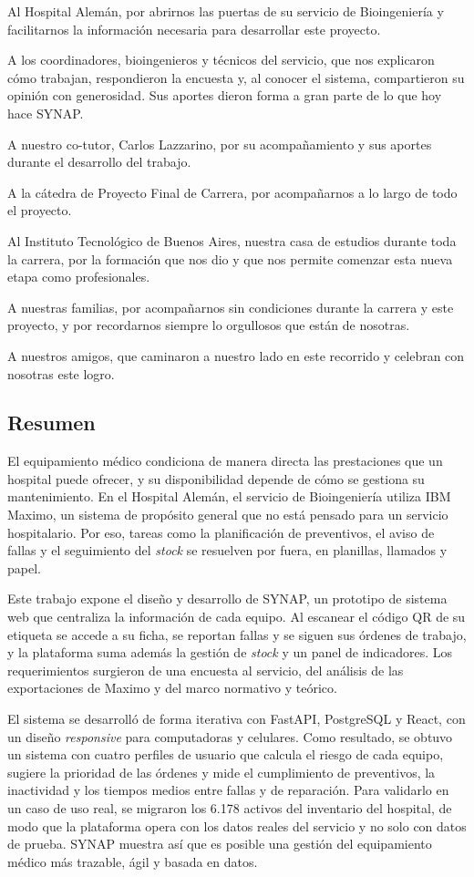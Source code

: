 \documentclass[10pt]{article}
\newcommand{\prefsubsection}[1]{%
  \phantomsection
  \subsection*{#1}%
  \addcontentsline{toc}{subsection}{#1}%
}
\begin{document}
Al Hospital Alemán, por abrirnos las puertas de su servicio de Bioingeniería y facilitarnos la información necesaria para desarrollar este proyecto.

A los coordinadores, bioingenieros y técnicos del servicio, que nos explicaron cómo trabajan, respondieron la encuesta y, al conocer el sistema, compartieron su opinión con generosidad. Sus aportes dieron forma a gran parte de lo que hoy hace SYNAP.

A nuestro co-tutor, Carlos Lazzarino, por su acompañamiento y sus aportes durante el desarrollo del trabajo.

A la cátedra de Proyecto Final de Carrera, por acompañarnos a lo largo de todo el proyecto.

Al Instituto Tecnológico de Buenos Aires, nuestra casa de estudios durante toda la carrera, por la formación que nos dio y que nos permite comenzar esta nueva etapa como profesionales.

A nuestras familias, por acompañarnos sin condiciones durante la carrera y este proyecto, y por recordarnos siempre lo orgullosos que están de nosotras.

A nuestros amigos, que caminaron a nuestro lado en este recorrido y celebran con nosotras este logro.

\newpage
\prefsubsection{Resumen}

El equipamiento médico condiciona de manera directa las prestaciones que un hospital puede ofrecer, y su disponibilidad depende de cómo se gestiona su mantenimiento. En el Hospital Alemán, el servicio de Bioingeniería utiliza IBM Maximo, un sistema de propósito general que no está pensado para un servicio hospitalario. Por eso, tareas como la planificación de preventivos, el aviso de fallas y el seguimiento del \textit{stock} se resuelven por fuera, en planillas, llamados y papel. 

Este trabajo expone el diseño y desarrollo de SYNAP, un prototipo de sistema web que centraliza la información de cada equipo. Al escanear el código QR de su etiqueta se accede a su ficha, se reportan fallas y se siguen sus órdenes de trabajo, y la plataforma suma además la gestión de \textit{stock} y un panel de indicadores. Los requerimientos surgieron de una encuesta al servicio, del análisis de las exportaciones de Maximo y del marco normativo y teórico. 

El sistema se desarrolló de forma iterativa con FastAPI, PostgreSQL y React, con un diseño \textit{responsive} para computadoras y celulares. Como resultado, se obtuvo un sistema con cuatro perfiles de usuario que calcula el riesgo de cada equipo, sugiere la prioridad de las órdenes y mide el cumplimiento de preventivos, la inactividad y los tiempos medios entre fallas y de reparación. Para validarlo en un caso de uso real, se migraron los 6.178 activos del inventario del hospital, de modo que la plataforma opera con los datos reales del servicio y no solo con datos de prueba. SYNAP muestra así que es posible una gestión del equipamiento médico más trazable, ágil y basada en datos.
\end{document}
